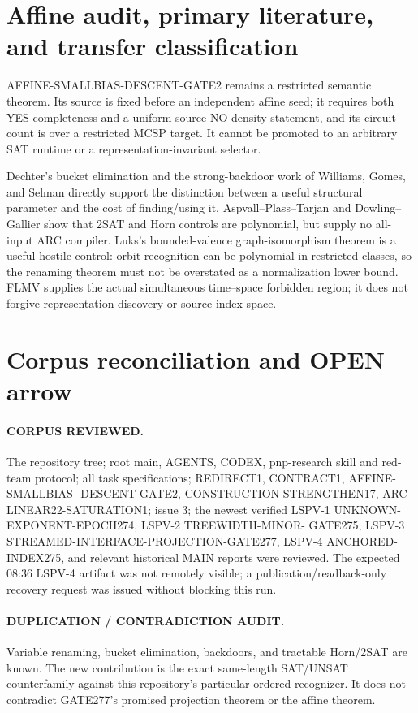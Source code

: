 \documentclass[11pt]{article}
\begin{document}
\section{Affine audit, primary literature, and transfer classification}
AFFINE-SMALLBIAS-DESCENT-GATE2 remains a restricted semantic theorem.  Its
source is fixed before an independent affine seed; it requires both YES
completeness and a uniform-source NO-density statement, and its circuit count
is over a restricted MCSP target.  It cannot be promoted to an arbitrary SAT
runtime or a representation-invariant selector.

Dechter's bucket elimination and the strong-backdoor work of Williams,
Gomes, and Selman directly support the distinction between a useful structural
parameter and the cost of finding/using it.  Aspvall--Plass--Tarjan and
Dowling--Gallier show that 2SAT and Horn controls are polynomial, but supply no
all-input ARC compiler.  Luks's bounded-valence graph-isomorphism theorem is a
useful hostile control: orbit recognition can be polynomial in restricted
classes, so the renaming theorem must not be overstated as a normalization
lower bound.  FLMV supplies the actual simultaneous time--space forbidden
region; it does not forgive representation discovery or source-index space.

\section{Corpus reconciliation and OPEN arrow}
\paragraph{CORPUS REVIEWED.}
The repository tree; root main, AGENTS, CODEX, pnp-research skill and red-team
protocol; all task specifications; REDIRECT1, CONTRACT1, AFFINE-SMALLBIAS-
DESCENT-GATE2, CONSTRUCTION-STRENGTHEN17, ARC-LINEAR22-SATURATION1; issue 3;
the newest verified LSPV-1 UNKNOWN-EXPONENT-EPOCH274, LSPV-2 TREEWIDTH-MINOR-
GATE275, LSPV-3 STREAMED-INTERFACE-PROJECTION-GATE277, LSPV-4 ANCHORED-
INDEX275, and relevant historical MAIN reports were reviewed.  The expected
08:36 LSPV-4 artifact was not remotely visible; a publication/readback-only
recovery request was issued without blocking this run.

\paragraph{DUPLICATION / CONTRADICTION AUDIT.}
Variable renaming, bucket elimination, backdoors, and tractable Horn/2SAT are
known.  The new contribution is the exact same-length SAT/UNSAT counterfamily
against this repository's particular ordered recognizer.  It does not
contradict GATE277's promised projection theorem or the affine theorem.
\end{document}
